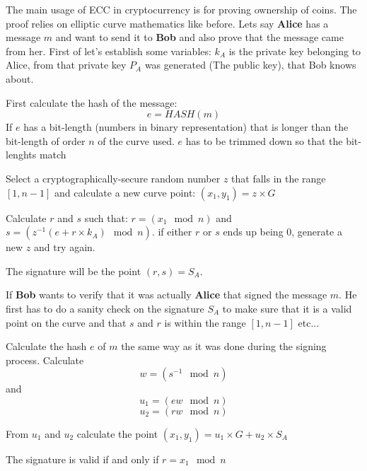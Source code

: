 The main usage of ECC in cryptocurrency is for proving ownership of coins. The proof relies on elliptic curve mathematics like before. Lets say \textbf{Alice} has a message $m$ and want to send it to \textbf{Bob} and also prove that the message came from her. First of let's establish some variables: $k_A$ is the private key belonging to Alice, from that private key $P_A$ was generated (The public key), that Bob knows about. 

First calculate the hash of the message:
$$e=HASH(m)$$
If $e$ has a bit-length (numbers in binary representation) that is longer than the bit-length of order $n$ of the curve used. $e$ has to be trimmed down so that the bit-lenghts match

Select a cryptographically-secure random number $z$ that falls in the range $[1, n-1]$ and calculate a new curve point: $(x_1, y_1) = z \times G$

Calculate $r$ and $s$ such that: $r = (x_1 \mod n)$ and $s = (z^{-1} (e + r \times k_A) \mod n)$. if either $r$ or $s$ ends up being 0, generate a new $z$ and try again.

The signature will be the point $(r, s) = S_A$.

If \textbf{Bob} wants to verify that it was actually \textbf{Alice} that signed the message $m$. He first has to do a sanity check on the signature $S_A$ to make sure that it is a valid point on the curve and that $s$ and $r$ is within the range $[1, n-1]$ etc... 

Calculate the hash $e$ of $m$ the same way as it was done during the signing process. Calculate $$w=(s^{-1} \mod n)$$ and $$u_1 = (ew \mod n)$$ $$u_2 = (rw \mod n)$$

From $u_1$ and $u_2$ calculate the point $(x_1, y_1) = u_1 \times G + u_2 \times S_A$ 

The signature is valid if and only if $r = x_1 \mod n$